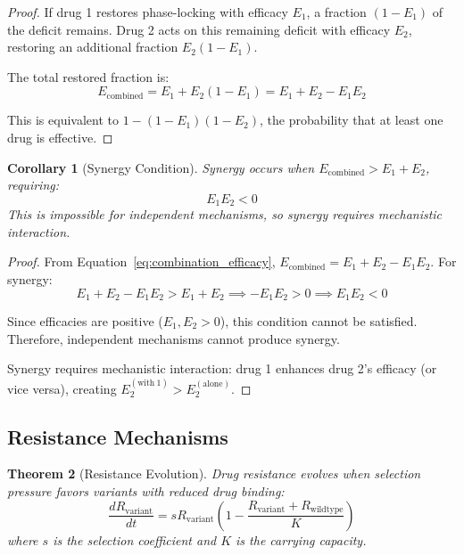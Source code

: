 \documentclass[11pt,twocolumn,a4paper]{article}
\newtheorem{theorem}{Theorem}[section]
\newtheorem{corollary}[theorem]{Corollary}
\theoremstyle{definition}
\theoremstyle{remark}
\begin{document}
\begin{proof}
If drug 1 restores phase-locking with efficacy $E_1$, a fraction $(1 - E_1)$ of the deficit remains. Drug 2 acts on this remaining deficit with efficacy $E_2$, restoring an additional fraction $E_2(1 - E_1)$.

The total restored fraction is:
\begin{equation}
E_{\mathrm{combined}} = E_1 + E_2(1 - E_1) = E_1 + E_2 - E_1 E_2
\end{equation}

This is equivalent to $1 - (1-E_1)(1-E_2)$, the probability that at least one drug is effective.
\end{proof}

\begin{corollary}[Synergy Condition]
\label{cor:synergy}
Synergy occurs when $E_{\mathrm{combined}} > E_1 + E_2$, requiring:
\begin{equation}
E_1 E_2 < 0
\label{eq:synergy_condition}
\end{equation}
This is impossible for independent mechanisms, so synergy requires mechanistic interaction.
\end{corollary}

\begin{proof}
From Equation~\eqref{eq:combination_efficacy}, $E_{\mathrm{combined}} = E_1 + E_2 - E_1 E_2$. For synergy:
\begin{equation}
E_1 + E_2 - E_1 E_2 > E_1 + E_2 \implies -E_1 E_2 > 0 \implies E_1 E_2 < 0
\end{equation}

Since efficacies are positive ($E_1, E_2 > 0$), this condition cannot be satisfied. Therefore, independent mechanisms cannot produce synergy.

Synergy requires mechanistic interaction: drug 1 enhances drug 2's efficacy (or vice versa), creating $E_2^{\mathrm{(with\ 1)}} > E_2^{\mathrm{(alone)}}$.
\end{proof}

\subsection{Resistance Mechanisms}

\begin{theorem}[Resistance Evolution]
\label{thm:resistance_evolution}
Drug resistance evolves when selection pressure favors variants with reduced drug binding:
\begin{equation}
\frac{dR_{\mathrm{variant}}}{dt} = s R_{\mathrm{variant}} \left(1 - \frac{R_{\mathrm{variant}} + R_{\mathrm{wildtype}}}{K}\right)
\label{eq:resistance_evolution}
\end{equation}
where $s$ is the selection coefficient and $K$ is the carrying capacity.
\end{theorem}
\end{document}
